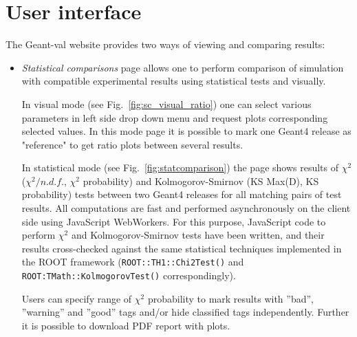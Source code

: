 \section{User interface}
\label{sec-analyse}

The \textsf{Geant-val} website provides two ways of viewing and comparing results:

\begin{itemize}



\item \textit{Statistical comparisons} page allows one to perform comparison of simulation with compatible experimental results using statistical tests and visually. %

In visual mode  (see Fig.~\ref{fig:sc_visual_ratio}) one can select various parameters in left side drop down menu and request plots corresponding selected values. In this mode page it is possible to mark one Geant4 release as "reference" to get ratio plots between several results.

In statistical mode (see Fig.~\ref{fig:statcomparison}) the page shows results of $\chi^2$ ($\chi^2/n.d.f.$, $\chi^2$ probability) and Kolmogorov-Smirnov (KS Max(D), KS probability) tests between two Geant4 releases for all matching pairs of test results.
All computations are fast and performed asynchronously on the client side using JavaScript WebWorkers. For this purpose, JavaScript code to perform $\chi^2$ and Kolmogorov-Smirnov tests have been written, and their results cross-checked against the same statistical techniques implemented in the ROOT framework ({\tt ROOT::TH1::Chi2Test()} and {\tt ROOT:TMath::KolmogorovTest()} correspondingly).

Users can specify range of $\chi^2$ probability to mark results with ''bad'', ''warning'' and ''good'' tags and/or hide classified tags independently. Further it is possible to download PDF report with plots.


\end{itemize}
